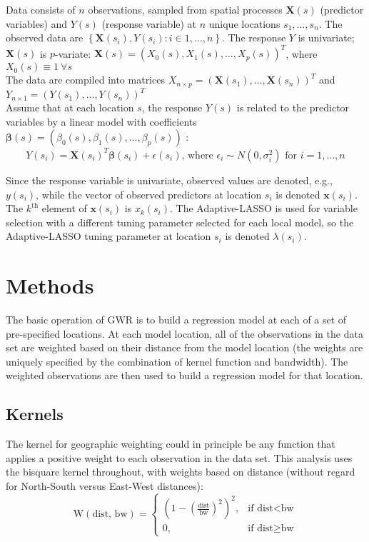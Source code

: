 \documentclass[10pt]{amsart}
\newcommand{\vect}[1]{\boldsymbol{#1}}
\begin{document}
	Data consists of $n$ observations, sampled from spatial processes $\vect{X}(s)$ (predictor variables) and $Y(s)$ (response variable) at $n$ unique locations $s_1, \dots, s_n$. The observed data are $\left\{ \vect{X}(s_i) , Y(s_i) : i \in 1, \dots, n \right\}$. The response $Y$ is univariate; $\vect{X}(s)$ is $p$-variate: $\vect{X}(s) = (X_0(s), X_1(s), \dots, X_p(s))^T$, where $X_0(s) \equiv 1 \: \forall s$ \\
	
	The data are compiled into matrices $X_{n \times p} = \left( \vect{X}(s_1), \dots, \vect{X}(s_n) \right)^T$ and $Y_{n \times 1} = \left(Y(s_1), \dots, Y(s_n) \right)^T$\\
		
	Assume that at each location $s$, the response $Y(s)$ is related to the predictor variables by a linear model with coefficients $\vect{\beta}(s) = (\beta_0(s), \beta_1(s), \dots, \beta_p(s))$ :\\
	
	\[
		Y(s_i) = \vect{X}(s_i)^T \vect{\beta}(s_i) + \epsilon(s_i) \text{, where } \epsilon_i \sim N\left( 0, \sigma_i^2 \right) \text{ for } i=1, \dots, n
	\]
	
	Since the response variable is univariate, observed values are denoted, e.g., $y(s_i)$, while the vector of observed predictors at location $s_i$ is denoted $\vect{x}(s_i)$. The $k^{\text{th}}$ element of $\vect{x}(s_i)$ is $x_k(s_i)$. The Adaptive-LASSO is used for variable selection with a different tuning parameter selected for each local model, so the Adaptive-LASSO tuning parameter at location $s_i$ is denoted $\lambda(s_i)$.\\ 
	

\section{Methods}
	The basic operation of GWR is to build a regression model at each of a set of pre-specified locations. At each model location, all of the observations in the data set are weighted based on their distance from the model location (the weights are uniquely specified by the combination of kernel function and bandwidth). The weighted observations are then used to build a regression model for that location.\\
	
	\subsection{Kernels}
		The kernel for geographic weighting could in principle be any function that applies a positive weight to each observation in the data set. This analysis uses the bisquare kernel throughout, with weights based on distance (without regard for North-South versus East-West distances):
		\[
			\text{W}(\text{dist, bw}) = \begin{cases} (1-(\frac{\text{dist}}{\text{bw}})^2)^2, & \mbox{if dist} < \mbox{bw} \\
			0, & \mbox{if dist} \ge \mbox{bw} \end{cases}
		\]
		
\end{document}
